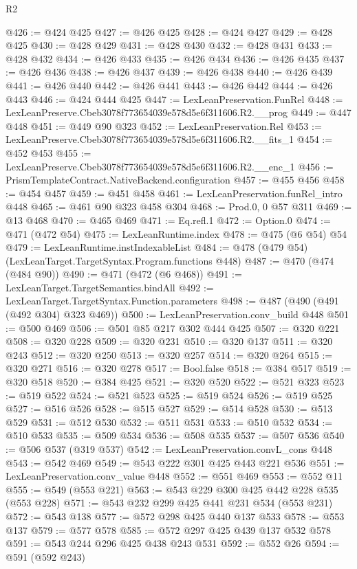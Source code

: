 \begin{lexlean}{R2}
\begin{coremodule}
@426 := @424 @425
@427 := @426 @425
@428 := @424 @427
@429 := @428 @425
@430 := @428 @429
@431 := @428 @430
@432 := @428 @431
@433 := @428 @432
@434 := @426 @433
@435 := @426 @434
@436 := @426 @435
@437 := @426 @436
@438 := @426 @437
@439 := @426 @438
@440 := @426 @439
@441 := @426 @440
@442 := @426 @441
@443 := @426 @442
@444 := @426 @443
@446 := @424 @444 @425
@447 := LexLeanPreservation.FunRel
@448 := LexLeanPreserve.Cbeb3078f773654039e578d5e6f311606.R2.__prog
@449 := @447 @448
@451 := @449 @90 @323
@452 := LexLeanPreservation.Rel
@453 := LexLeanPreserve.Cbeb3078f773654039e578d5e6f311606.R2.__fits_1
@454 := @452 @453
@455 := LexLeanPreserve.Cbeb3078f773654039e578d5e6f311606.R2.__enc_1
@456 := PrismTemplateContract.NativeBackend.configuration
@457 := @455 @456
@458 := @454 @457
@459 := @451 @458
@461 := LexLeanPreservation.funRel_intro @448
@465 := @461 @90 @323 @458 @304
@468 := Prod.{0, 0} @57 @311
@469 := @13 @468
@470 := @465 @469
@471 := Eq.refl.{1}
@472 := Option.{0}
@474 := @471 (@472 @54)
@475 := LexLeanRuntime.index
@478 := @475 (@6 @54) @54
@479 := LexLeanRuntime.instIndexableList
@484 := @478 (@479 @54) (LexLeanTarget.TargetSyntax.Program.functions @448)
@487 := @470 (@474 (@484 @90))
@490 := @471 (@472 (@6 @468))
@491 := LexLeanTarget.TargetSemantics.bindAll
@492 := LexLeanTarget.TargetSyntax.Function.parameters
@498 := @487 (@490 (@491 (@492 @304) @323 @469))
@500 := LexLeanPreservation.conv_build @448
@501 := @500 @469
@506 := @501 @85 @217 @302 @444 @425
@507 := @320 @221
@508 := @320 @228
@509 := @320 @231
@510 := @320 @137
@511 := @320 @243
@512 := @320 @250
@513 := @320 @257
@514 := @320 @264
@515 := @320 @271
@516 := @320 @278
@517 := Bool.false
@518 := @384 @517
@519 := @320 @518
@520 := @384 @425
@521 := @320 @520
@522 := @521 @323
@523 := @519 @522
@524 := @521 @523
@525 := @519 @524
@526 := @519 @525
@527 := @516 @526
@528 := @515 @527
@529 := @514 @528
@530 := @513 @529
@531 := @512 @530
@532 := @511 @531
@533 := @510 @532
@534 := @510 @533
@535 := @509 @534
@536 := @508 @535
@537 := @507 @536
@540 := @506 @537 (@319 @537)
@542 := LexLeanPreservation.convL_cons @448
@543 := @542 @469
@549 := @543 @222 @301 @425 @443 @221 @536
@551 := LexLeanPreservation.conv_value @448
@552 := @551 @469
@553 := @552 @11
@555 := @549 (@553 @221)
@563 := @543 @229 @300 @425 @442 @228 @535 (@553 @228)
@571 := @543 @232 @299 @425 @441 @231 @534 (@553 @231)
@572 := @543 @138
@577 := @572 @298 @425 @440 @137 @533
@578 := @553 @137
@579 := @577 @578
@585 := @572 @297 @425 @439 @137 @532 @578
@591 := @543 @244 @296 @425 @438 @243 @531
@592 := @552 @26
@594 := @591 (@592 @243)

\end{coremodule}
\end{lexlean}

